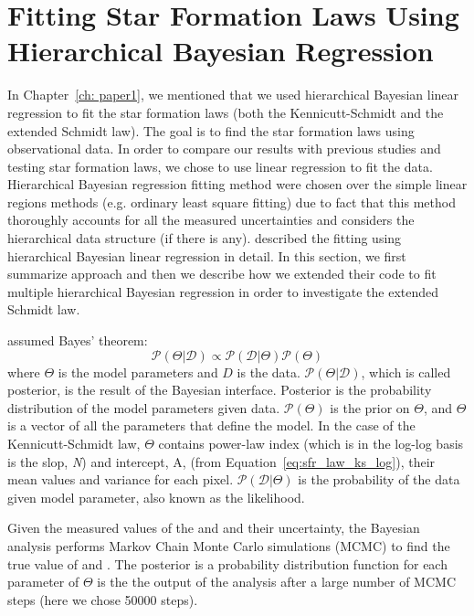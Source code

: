 \chapter{Fitting Star Formation Laws Using Hierarchical Bayesian Regression}
\pagestyle{plain}
\label{app:bays_fitting}
\myappendices

In Chapter~\ref{ch: paper1}, we mentioned that we used hierarchical Bayesian linear regression to fit the star formation laws (both the Kennicutt-Schmidt and the extended Schmidt law).
The goal is to find the star formation laws using observational data.
In order to compare our results with previous studies and testing star formation laws, we chose to use linear regression to fit the data.
Hierarchical Bayesian regression fitting method were chosen over the simple linear regions methods (e.g. ordinary least square fitting) due to fact that this method thoroughly accounts for all the measured uncertainties and considers the hierarchical data structure (if there is any).
\cite{Shetty13} described the fitting using hierarchical Bayesian linear regression in detail.
In this section, we first summarize \cite{Shetty13} approach and then we describe how we extended their code to fit multiple hierarchical Bayesian regression in order to investigate the extended Schmidt law.

\cite{Shetty13} assumed Bayes' theorem:
\begin{equation}
  \mathcal{P}({\Theta | \mathcal{D}})  \propto \mathcal{P}({\mathcal{D}|\Theta})\mathcal{P}(\Theta)
\end{equation}
where $\Theta$ is the model parameters and $D$ is the data.
$\mathcal{P}({\Theta | \mathcal{D}})$, which is called posterior, is the result of the Bayesian interface.
Posterior is the probability distribution of the model parameters given data. 
$\mathcal{P}(\Theta)$ is the prior on $\Theta$, and $\Theta$ is a vector of all the parameters that define the model.
In the case of the Kennicutt-Schmidt law, $\Theta$ contains power-law index (which is in the log-log basis is the slop,  {\it N}) and intercept, A, (from Equation~\ref{eq:sfr_law_ks_log}), their mean values and variance for each pixel. 
$\mathcal{P}({\mathcal{D}|\Theta})$ is the probability of the data given model parameter, also known as the likelihood.


Given the measured values of the \sigmagas and \sigmasfr and their uncertainty, the Bayesian analysis performs Markov Chain Monte Carlo simulations (MCMC) to find the true value of \sigmagas and \sigmasfr.
The posterior is a probability distribution function for each parameter of $\Theta$ is the the output of the analysis after a large number of MCMC steps (here we chose 50000 steps).

